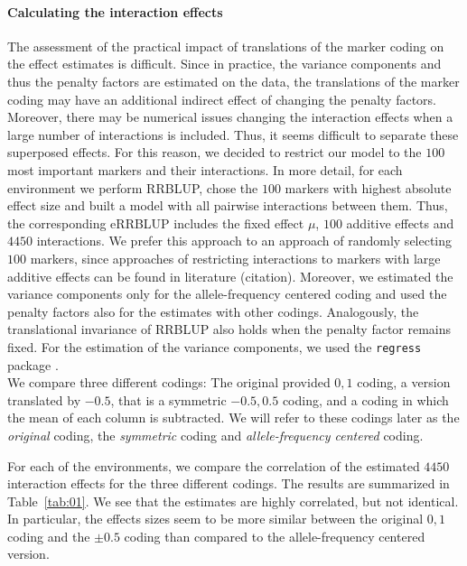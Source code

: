 \documentclass{bmcart}
\newcommand{\0}{\mathbf{0}}
\begin{document}
\paragraph{Calculating the interaction effects} 
The assessment of the practical impact of translations of the marker coding on the effect estimates is difficult. 
Since in practice, the variance components and thus the penalty factors are estimated on the data, the translations of the marker coding may have an additional indirect effect of changing the penalty factors. Moreover, there may be numerical issues changing the interaction effects when a large number of interactions is included.
Thus, it seems difficult to separate these superposed effects. For this reason, we decided to restrict our model to the $100$ most important markers and their interactions. In more detail, for each environment we perform RRBLUP, chose the $100$ markers with highest absolute effect size and built a model with all pairwise interactions between them. Thus, the corresponding eRRBLUP includes the fixed effect $\mu$, $100$ additive effects and $4450$ interactions. We prefer this approach to an approach of randomly selecting $100$ markers, since approaches of restricting interactions to markers with large additive effects can be found in literature (citation). Moreover, we estimated the variance components only for the allele-frequency centered coding and used the penalty factors also for the estimates with other codings. Analogously, the translational invariance of RRBLUP also holds when the penalty factor remains fixed. For the estimation of the variance components, we used the \texttt{regress} package \cite{clifford2014regress}.\\

We compare three different codings: The original provided ${0,1}$ coding, a version translated by $-0.5$, that is a symmetric $-0.5, 0.5$ coding, and a coding in which the mean of each column is subtracted. We will refer to these codings later as the \emph{original} coding, the \emph{symmetric} coding and \emph{allele-frequency centered} coding.


For each of the environments, we compare the correlation of the estimated $4450$ interaction effects for the three different codings. The results are summarized in Table~\ref{tab:01}. 
We see that the estimates are highly correlated, but not identical. In particular, the effects sizes seem to be more similar between the original $0,1$ coding and the $\pm 0.5$ coding than compared to the allele-frequency centered version.
\end{document}
